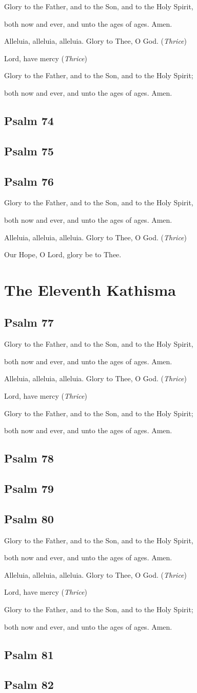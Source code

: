 \documentclass[12pt,openany]{book}
\newcommand{\kathismabreak}{
  \medskip
  \begin{center}
  \begin{footnotesize}
  Glory to the Father, and to the Son, and to the Holy Spirit,
  
  both now and ever, and unto the ages of ages. Amen.

  Alleluia, alleluia, alleluia. Glory to Thee, O God. (\textit{Thrice})

  Lord, have mercy (\textit{Thrice})

  Glory to the Father, and to the Son, and to the Holy Spirit;
  
  both now and ever, and unto the ages of ages. Amen.
  \end{footnotesize}
  \end{center}
  \smallbreak
}
\newcommand{\kathismaend}{
  \medskip
  \begin{center}
  \begin{footnotesize}
  Glory to the Father, and to the Son, and to the Holy Spirit,
  
  both now and ever, and unto the ages of ages. Amen.

  Alleluia, alleluia, alleluia. Glory to Thee, O God. (\textit{Thrice})

  Our Hope, O Lord, glory be to Thee.
  \end{footnotesize}
  \end{center}
  \smallbreak
}
\begin{document}
\kathismabreak
\smallskip

\section{Psalm 74}

\smallskip
\section{Psalm 75}

\smallskip
\section{Psalm 76}


\kathismaend

\chapter*{The Eleventh Kathisma}
\smallskip
\section{Psalm 77}


\pagebreak %
\kathismabreak
\smallskip

\section{Psalm 78}

\smallskip
\section{Psalm 79}

\bigskip
\section{Psalm 80}


\pagebreak %
\kathismabreak
\smallskip

\section{Psalm 81}

\smallskip
\section{Psalm 82}

\smallskip
\end{document}
